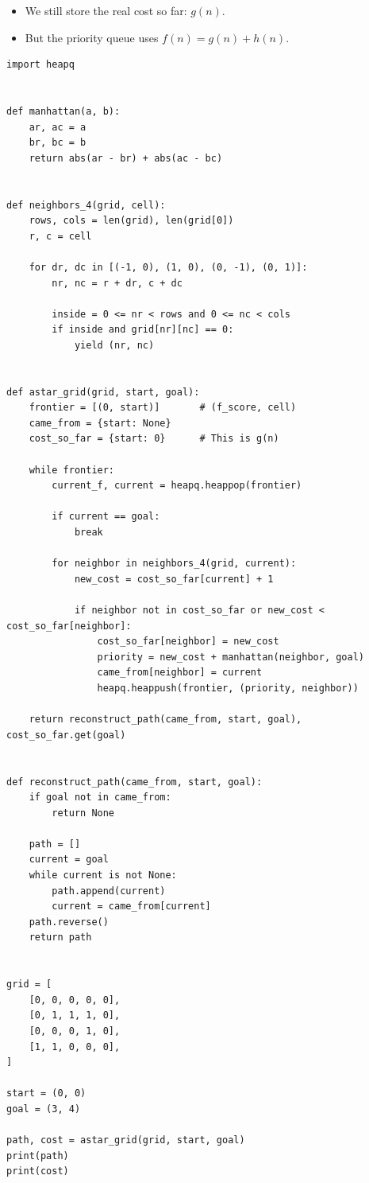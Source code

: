 \documentclass[11pt,a4paper]{article}
\begin{document}
\begin{itemize}[leftmargin=*]
  \item We still store the real cost so far: $g(n)$.
  \item But the priority queue uses $f(n)=g(n)+h(n)$.
\end{itemize}

\begin{lstlisting}[style=pythonstyle]
import heapq


def manhattan(a, b):
    ar, ac = a
    br, bc = b
    return abs(ar - br) + abs(ac - bc)


def neighbors_4(grid, cell):
    rows, cols = len(grid), len(grid[0])
    r, c = cell

    for dr, dc in [(-1, 0), (1, 0), (0, -1), (0, 1)]:
        nr, nc = r + dr, c + dc

        inside = 0 <= nr < rows and 0 <= nc < cols
        if inside and grid[nr][nc] == 0:
            yield (nr, nc)


def astar_grid(grid, start, goal):
    frontier = [(0, start)]       # (f_score, cell)
    came_from = {start: None}
    cost_so_far = {start: 0}      # This is g(n)

    while frontier:
        current_f, current = heapq.heappop(frontier)

        if current == goal:
            break

        for neighbor in neighbors_4(grid, current):
            new_cost = cost_so_far[current] + 1

            if neighbor not in cost_so_far or new_cost < cost_so_far[neighbor]:
                cost_so_far[neighbor] = new_cost
                priority = new_cost + manhattan(neighbor, goal)
                came_from[neighbor] = current
                heapq.heappush(frontier, (priority, neighbor))

    return reconstruct_path(came_from, start, goal), cost_so_far.get(goal)


def reconstruct_path(came_from, start, goal):
    if goal not in came_from:
        return None

    path = []
    current = goal
    while current is not None:
        path.append(current)
        current = came_from[current]
    path.reverse()
    return path


grid = [
    [0, 0, 0, 0, 0],
    [0, 1, 1, 1, 0],
    [0, 0, 0, 1, 0],
    [1, 1, 0, 0, 0],
]

start = (0, 0)
goal = (3, 4)

path, cost = astar_grid(grid, start, goal)
print(path)
print(cost)
\end{lstlisting}
\end{document}
